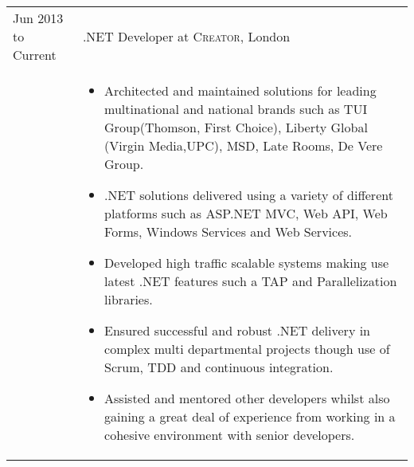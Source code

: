 \documentclass[a4paper,10pt]{article} %
\begin{document}
\begin{tabular}{ L{2cm} | L{11cm}}	


Jun 2013 to Current & .NET Developer at \textsc{Creator}, London \\

 
 





 
&\MPtrue	   
\begin{itemize}[leftmargin=*]
 
 
 
 
 
		\item Architected and maintained solutions for leading multinational and national brands such as TUI Group(Thomson, First Choice), Liberty Global (Virgin Media,UPC), MSD, Late Rooms, De Vere Group. 

		\item .NET solutions delivered using a variety of different platforms such as ASP.NET MVC, Web API, Web Forms, Windows Services and Web Services.
																		
		\item Developed high traffic scalable systems making use latest .NET features such a TAP and Parallelization libraries.

		\item Ensured successful and robust .NET delivery in complex multi departmental projects though use of Scrum, TDD and continuous integration.

		\item Assisted and mentored other developers whilst also gaining a great deal of experience from working in a cohesive environment with senior developers. 
	\end{itemize} \\
   

\end{tabular}
\end{document}
